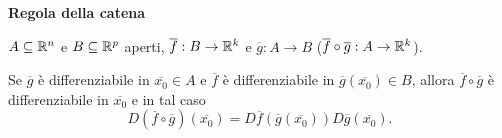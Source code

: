 \begin{theorem} \textbf{Regola della catena}
	
	$A \subseteq \mathbb{R}^n$ e $B \subseteq \mathbb{R}^p$ aperti, $\overline{f}: B \rightarrow \mathbb{R}^k$ e $\overline{g}:A \rightarrow B$
	{\color{blue}($\overline{f}\circ \overline{g}: A \rightarrow \mathbb{R}^k$)}.
	
	Se $\overline{g}$ è differenziabile in $\overline{x_0}\in A$ e $\overline{f}$ è differenziabile in $\overline{g}(\overline{x_0})\in B$, allora $\overline{f}\circ \overline{g}$ è differenziabile in $\overline{x_0}$ e in tal caso
	\begin{equation*}
		D(\overline{f}\circ \overline{g})(\overline{x_0})=D\overline{f}(\overline{g}(\overline{x_0}))D\overline{g}(\overline{x_0}).
	\end{equation*}	
\end{theorem}

